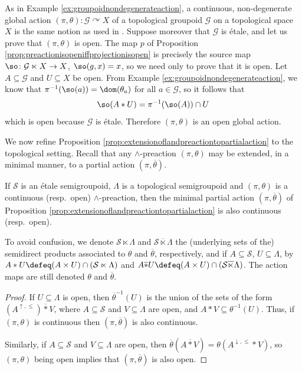 \begin{example}
As in Example \ref{ex:groupoidnondegenerateaction}, a continuous, non-degenerate global action $(\pi,\theta)\colon\mathcal{G}\curvearrowright X$ of a topological groupoid $\mathcal{G}$ on a topological space $X$ is the same notion as used in \cite[Definition 3.6]{MR2969047}. Suppose moreover that $\mathcal{G}$ is étale, and let us prove that $(\pi,\theta)$ is open. The map $p$ of Proposition \ref{prop:preactionisopeniffprojectionisopen} is precisely the source map $\so\colon\mathcal{G}\ltimes X\to X$, $\so(g,x)=x$, so we need only to prove that it is open. Let $A\subseteq\mathcal{G}$ and $U\subseteq X$ be open. From Example \ref{ex:groupoidnondegenerateaction}, we know that $\pi^{-1}(\so(a))=\dom(\theta_a)$ for all $a\in\mathcal{G}$, so it follows that
\[\so(A\ast U)=\pi^{-1}(\so(A))\cap U\]
which is open because $\mathcal{G}$ is étale. Therefore $(\pi,\theta)$ is an open global action.
\end{example}

We now refine Proposition \ref{prop:extensionoflandpreactiontopartialaction} to the topological setting. Recall that any $\land$-preaction $(\pi,\theta)$ may be extended, in a minimal manner, to a partial action $(\pi,\overline{\theta})$.

\begin{proposition}
If $\mathcal{S}$ is an étale semigroupoid, $\Lambda$ is a topological semigroupoid and $(\pi,\theta)$ is a continuous (resp.\ open) $\land$-preaction, then the minimal partial action $(\pi,\overline{\theta})$ of Proposition \ref{prop:extensionoflandpreactiontopartialaction} is also continuous (resp.\ open).
\end{proposition}

To avoid confusion, we denote $\mathcal{S}\ltimes\Lambda$ and $\mathcal{S}\overline{\ltimes}\Lambda$ the (underlying sets of the) semidirect products associated to $\theta$ and $\overline{\theta}$, respectively, and if $A\subseteq\mathcal{S}$, $U\subseteq\Lambda$, by $A\ast U\defeq(A\times U)\cap(\mathcal{S}\ltimes\Lambda)$ and $A\overline{\ast}U\defeq(A\times U)\cap(\mathcal{S}\overline{\ltimes}\Lambda)$. The action maps are still denoted $\theta$ and $\overline{\theta}$.

\begin{proof}
    If $U\subseteq\Lambda$ is open, then $\overline{\theta}^{-1}(U)$ is the union of the sets of the form $(A^{\uparrow,\leq})\overline{\ast} V$, where $A\subseteq \mathcal{S}$ and $V\subseteq\Lambda$ are open, and $A\ast V\subseteq\theta^{-1}(U)$. Thus, if $(\pi,\theta)$ is continuous then $(\pi,\overline{\theta})$ is also continuous.
    
    Similarly, if $A\subseteq\mathcal{S}$ and $V\subseteq\Lambda$ are open, then $\overline{\theta}(A\overline{\ast} V)=\theta(A^{\downarrow,\leq}\ast V)$, so $(\pi,\theta)$ being open implies that $(\pi,\overline{\theta})$ is also open. \end{proof}